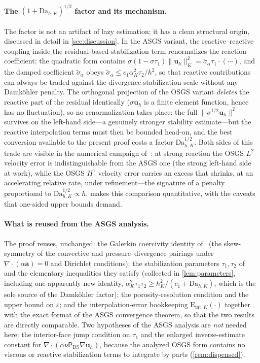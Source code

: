 \documentclass[11pt]{article}
\theoremstyle{remark}
\newcommand{\bu}{\boldsymbol{u}}
\newcommand{\ba}{\boldsymbol{a}}
\newcommand{\ViscProj}{\mathsf{P}_{\mathrm{DS}}}
\newcommand{\norm}[1]{\lVert #1 \rVert}
\newcommand{\Eint}[2]{\mathrm{E}_{\mathrm{int},#1}(#2)}
\newcommand{\Dah}{\mathrm{Da}_{h,K}}
\begin{document}
\paragraph{The $(1+\Dah)^{1/2}$ factor and its mechanism.}
The factor is not an artifact of lazy estimation; it has a clean structural origin,
discussed in detail in \cref{sec:discussion}. In the ASGS variant, the
reactive--reactive coupling inside the residual-based stabilization term renormalizes
the reaction coefficient: the quadratic form contains
$\sigma(1-\sigma\tau_1)\norm{\bu_h}^2_K = \widetilde{\sigma}_\alpha\tau_1\cdot(\cdots)$,
and the damped coefficient $\widetilde{\sigma}_\alpha$ obeys
$\widetilde{\sigma}_\alpha \le c_1\alpha_K^2\tau_{2}/h^2$, so that reactive
contributions can always be traded against the divergence-stabilization scale without
any Damk\"ohler penalty. The orthogonal projection of the OSGS variant \emph{deletes}
the reactive part of the residual identically ($\sigma\bu_h$ is a finite element
function, hence has no fluctuation), so no renormalization takes place: the full
$\norm{\sigma^{1/2}\bu_h}^2$ survives on the left-hand side---a genuinely stronger
stability estimate---but the reactive interpolation terms must then be bounded head-on,
and the best conversion available to the present proof costs a factor $\Dah^{1/2}$. Both sides of this
trade are visible in the numerical campaign of~\cite{companion}: at strong reaction the
OSGS $L^2$ velocity error is indistinguishable from the ASGS one (the strong left-hand
side at work), while the OSGS $H^1$ velocity error carries an excess that shrinks, at
an accelerating relative rate, under refinement---the signature of a penalty
proportional to $\Dah^{1/2} \propto h$.  makes this comparison
quantitative, with the caveats that one-sided upper bounds demand.

\paragraph{What is reused from the ASGS analysis.}
The proof reuses, unchanged: the Galerkin coercivity identity of~\cite{companion}
(the skew-symmetry of the convective and pressure--divergence pairings under
$\nabla\cdot(\alpha\ba)=0$ and Dirichlet conditions); the stabilization parameters
$\tau_1,\tau_2$ of~\cite{companion} and the elementary inequalities they satisfy
(collected in \cref{lem:parameters}, including one apparently new identity,
$\alpha_K^2\tau_1\tau_2 \ge h_K^2/(c_1+\Dah)$, which is the sole source of the
Damk\"ohler factor); the porosity-resolution condition and the upper bound on
$\varepsilon$; and the interpolation-error bookkeeping
$\Eint{K}{\cdot}$ together with the exact format of the ASGS convergence theorem, so
that the two results are directly comparable. Two hypotheses of the ASGS analysis are
\emph{not} needed here: the interior-face jump condition on $\tau_1$ and the enlarged
inverse-estimate constant for $\nabla\cdot(\alpha\nu\ViscProj\nabla\bu_h)$, because
the analyzed OSGS form contains no viscous or reactive stabilization terms to integrate
by parts (\cref{rem:dispensed}).
\end{document}
